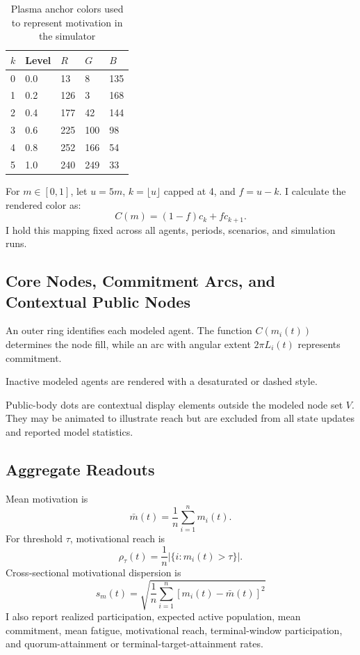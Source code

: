 \documentclass[11pt]{article}
\begin{document}
\begin{table}[h]
    \centering
    \begin{tabular}{|l|l|l|l|l|}
    \hline
        $k$& Level&  $R$&  $G$& $B$\\
    \hline
         0&  0.0&  13&  8& 135\\
    \hline
         1&  0.2&  126&  3& 168\\
    \hline
         2&  0.4&  177&  42& 144\\
    \hline
         3&  0.6&  225&  100& 98\\
    \hline
         4&  0.8&  252&  166& 54\\
    \hline
         5&  1.0&  240&  249& 33\\
    \hline
    \end{tabular}
    \caption{Plasma anchor colors used to represent motivation in the simulator}
\end{table}

For $m\in[0,1]$, let $u=5m$, $k=\lfloor u\rfloor$ capped at 4, and $f=u-k$. I calculate the rendered color as:
\[
C(m)=(1-f)c_k+fc_{k+1}.
\]
I hold this mapping fixed across all agents, periods, scenarios, and simulation runs.

\subsection{Core Nodes, Commitment Arcs, and Contextual Public Nodes}

An outer ring identifies each modeled agent. The function $C(m_i(t))$ determines the node fill, while an arc with angular extent $2\pi L_i(t)$ represents commitment.

Inactive modeled agents are rendered with a desaturated or dashed style.

Public-body dots are contextual display elements outside the modeled node set $V$. They may be animated to illustrate reach but are excluded from all state updates and reported model statistics.

\subsection{Aggregate Readouts}
Mean motivation is
\[
\bar{m}(t)=\frac{1}{n}\sum_{i=1}^nm_i(t).
\]
For threshold $\tau$, motivational reach is
\[
\rho_\tau(t)=\frac{1}{n}|\{i:m_i(t)>\tau\}|.
\]
Cross-sectional motivational dispersion is
\[
s_m(t)=\sqrt{\frac{1}{n}\sum_{i=1}^n[m_i(t)-\bar{m}(t)]^2}
\]
I also report realized participation, expected active population, mean commitment, mean fatigue, motivational reach, terminal-window participation, and quorum-attainment or terminal-target-attainment rates.
\end{document}
